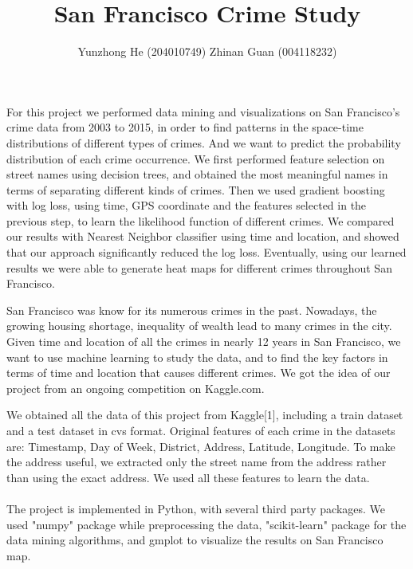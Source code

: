 \documentclass[12pt]{article}
\newenvironment{abs}[2][Part I Abstract]{\begin{trivlist}
\item[\hskip \labelsep {\bfseries #1}\hskip \labelsep {\bfseries #2}]}{\end{trivlist}}
\newenvironment{p1}[2][Part II Motivation]{\begin{trivlist}
\item[\hskip \labelsep {\bfseries #1}\hskip \labelsep {\bfseries #2}]}{\end{trivlist}}
\newenvironment{p2}[2][Part III Data and Software Tools]{\begin{trivlist}
\item[\hskip \labelsep {\bfseries #1}\hskip \labelsep {\bfseries #2}]}{\end{trivlist}}
\begin{document}
 
 
\title{San Francisco Crime Study}
\author{Yunzhong He (204010749) Zhinan Guan (004118232)}
\maketitle

\begin{abs}{}
\item{}
For this project we performed data mining and visualizations on San Francisco's crime data from 2003 to 2015, in order to find patterns in the space-time distributions of different types of crimes. And we want to predict the probability distribution of each crime occurrence. We first performed feature selection on street names using decision trees, and obtained the most meaningful names in terms of separating different kinds of crimes. Then we used gradient boosting with log loss, using time, GPS coordinate and the features selected in the previous step, to learn the likelihood function of different crimes. We compared our results with Nearest Neighbor classifier using time and location, and showed that our approach significantly reduced the log loss. Eventually, using our learned results we were able to generate heat maps for different crimes throughout San Francisco.
\end{abs}

\begin{p1}{}
\item{}
San Francisco was know for its numerous crimes in the past. Nowadays, the growing housing shortage,  inequality of wealth lead to many crimes in the city. Given time and location of all the crimes in nearly 12 years in San Francisco, we want to use machine learning to study the data, and to find the key factors in terms of time and location that causes different crimes. We got the idea of our project from an ongoing competition on Kaggle.com. 
\end{p1}

\begin{p2}{}
\item{}
We obtained all the data of this project from Kaggle[1], including a train dataset and a test dataset in cvs format. Original features of each crime in the datasets are: Timestamp, Day of Week, District, Address, Latitude, Longitude. To make the address useful, we extracted only the street name from the address rather than using the exact address. We used all these features to learn the data.\\\\
The project is implemented in Python, with several third party packages. We used "numpy" package while preprocessing the data, "scikit-learn" package for the data mining algorithms, and gmplot to visualize the results on San Francisco map. 
\end{p2}
\end{document}
